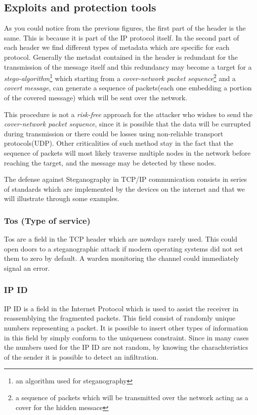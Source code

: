 \documentclass[../../main.tex]{subfiles}
\begin{document}
\subsection{Exploits and protection tools}

As you could notice from the previous figures, the first part of the header
is the same. This is because it is part of the IP protocol itself.
In the second part of each header we find different types of metadata which
are specific for each protocol. Generally the metadat contained in the
header is redundant for the transmission of the message itself and this 
redundancy may become a target for a \emph{stego-algorithm}\footnote{an
algorithm used for steganography} which starting from a \emph{cover-network
packet sequence}\footnote{a sequence of packets which will be transmitted
over the network acting as a cover for the hidden messace} and a
\emph{covert message}, can generate a sequence of packets(each one embedding
a portion of the covered message) which will be sent over the network.

This procedure is not a \emph{risk-free} approach for the attacker who
wishes to send the \emph{cover-network packet sequence}, since it is
possible that the data will be currupted during transmission or there could
be losses using non-reliable transport protocols(UDP).
Other criticalities of such method stay in the fact that the sequence of
packets will most likely traverse multiple nodes in the network before
reaching the target, and the message may be detected by these nodes.

The defense against Steganography in TCP/IP communication consists in 
series of standards which are implemented by the devices on the internet and
that we will illustrate through some examples.


\subsubsection{Tos (Type of service)}
Tos are a field in the TCP header which
are nowdays rarely used. This could open doors to a steganographic attack if
modern operating systems did not set them to zero by default.
A warden monitoring the channel could immediately signal an error.

\subsubsection{IP ID} IP ID is a field in the Internet Protocol which is used to
assist the receiver in reassemblying the fragmented packets.
This field consist of randomly unique numbers representing a packet.
It is possible to insert other types of information in this field by simply
conform to the uniqueness constraint.
Since in many cases the numbers used for the IP ID are not random, by
knowing the charachteristics of the sender it is possible to detect an
infiltration.
\end{document}
